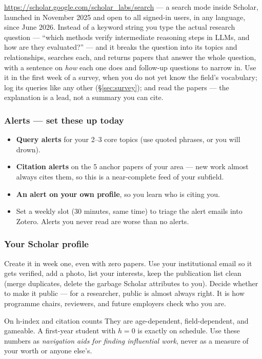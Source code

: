 \documentclass[11pt,a4paper]{article}
\begin{document}
\url{https://scholar.google.com/scholar_labs/search} --- a search mode inside
Scholar, launched in November 2025 and open to all signed-in users, in any
language, since June 2026. Instead of a keyword string you type the actual
research question --- ``which methods verify intermediate reasoning steps in
LLMs, and how are they evaluated?'' --- and it breaks the question into its
topics and relationships, searches each, and returns papers that answer the
whole question, with a sentence on \emph{how} each one does and follow-up
questions to narrow in. Use it in the first week of a survey, when you do not
yet know the field's vocabulary; log its queries like any other
(\S\ref{sec:survey}); and read the papers --- the explanation is a lead, not a
summary you can cite.

\subsubsection*{Alerts --- set these up today}

\begin{itemize}
  \item \textbf{Query alerts} for your 2--3 core topics (use quoted phrases, or
        you will drown).
  \item \textbf{Citation alerts} on the 5 anchor papers of your area --- new
        work almost always cites them, so this is a near-complete feed of your
        subfield.
  \item \textbf{An alert on your own profile}, so you learn who is citing you.
  \item Set a weekly slot (30 minutes, same time) to triage the alert emails
        into Zotero. Alerts you never read are worse than no alerts.
\end{itemize}

\subsubsection*{Your Scholar profile}

Create it in week one, even with zero papers. Use your institutional email so
it gets verified, add a photo, list your interests, keep the publication list
clean (merge duplicates, delete the garbage Scholar attributes to you). Decide
whether to make it public --- for a researcher, public is almost always right.
It is how programme chairs, reviewers, and future employers check who you are.

\begin{wbox}{On h-index and citation counts}
They are age-dependent, field-dependent, and gameable. A first-year student
with $h=0$ is exactly on schedule. Use these numbers as \emph{navigation aids
for finding influential work}, never as a measure of your worth or anyone
else's.
\end{wbox}
\end{document}
